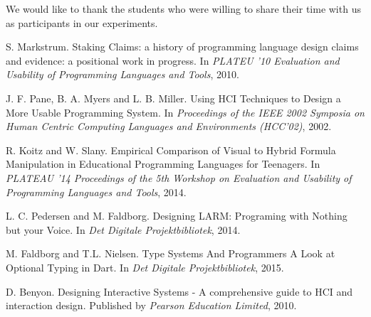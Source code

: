\documentclass[preprint,10pt]{sigplanconf}
\begin{document}
%

\acks
We would like to thank the students who were willing to share their time with us as participants in our experiments.





\begin{thebibliography}{}
\softraggedright

S. Markstrum. \newblock Staking Claims: a history of programming language design claims and evidence: a positional work in progress. \newblock In \emph{PLATEU '10 Evaluation and Usability of Programming Languages and Tools}, 2010.

J. F. Pane, B. A. Myers and L. B. Miller. \newblock Using HCI Techniques to Design a More Usable Programming System. \newblock In \emph{Proceedings of the IEEE 2002 Symposia on Human Centric Computing Languages and Environments (HCC’02)}, 2002.

R. Koitz and W. Slany. \newblock Empirical Comparison of Visual to Hybrid Formula Manipulation in Educational Programming Languages for Teenagers. \newblock In \emph{PLATEAU '14 Proceedings of the 5th Workshop on Evaluation and Usability of Programming Languages and Tools}, 2014.

L. C. Pedersen and M. Faldborg. \newblock Designing LARM: Programing with Nothing but your Voice. \newblock In \emph{Det Digitale Projektbibliotek}, 2014.

M. Faldborg and T.L. Nielsen. \newblock Type Systems And Programmers \: A Look at Optional Typing in Dart. \newblock In \emph{Det Digitale Projektbibliotek}, 2015.

D. Benyon. \newblock Designing Interactive Systems - A comprehensive guide to HCI and interaction design. \newblock Published by \emph{Pearson Education Limited}, 2010.


\end{thebibliography}
\end{document}
